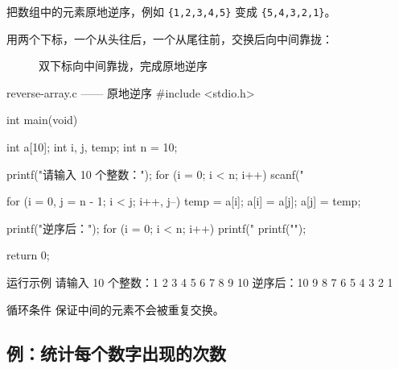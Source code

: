 \begin{example}
把数组中的元素原地逆序，例如 \texttt{\{1,2,3,4,5\}} 变成 \texttt{\{5,4,3,2,1\}}。
\end{example}
\begin{solution}
用两个下标，一个从头往后，一个从尾往前，交换后向中间靠拢：

\begin{figure}[htbp]
  \centering
  \caption{双下标向中间靠拢，完成原地逆序}
  \label{fig:reverse-array}
\end{figure}

\begin{codebox}{reverse-array.c —— 原地逆序}
#include <stdio.h>

int main(void)
{
    int a[10];
    int i, j, temp;
    int n = 10;

    printf("请输入 10 个整数：");
    for (i = 0; i < n; i++) {
        scanf("%
    }

    for (i = 0, j = n - 1; i < j; i++, j--) {
        temp = a[i];
        a[i] = a[j];
        a[j] = temp;
    }

    printf("逆序后：");
    for (i = 0; i < n; i++) {
        printf("%
    }
    printf("\n");

    return 0;
}
\end{codebox}

\begin{outbox}{运行示例}
请输入 10 个整数：1 2 3 4 5 6 7 8 9 10
逆序后：10 9 8 7 6 5 4 3 2 1
\end{outbox}

循环条件  保证中间的元素不会被重复交换。
\end{solution}

\subsection{例：统计每个数字出现的次数}

